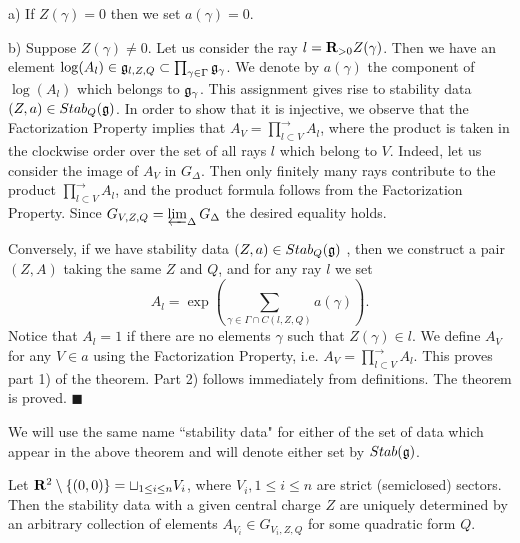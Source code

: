 \documentclass[12pt]{article}
\begin{document}
a) If $Z(\gamma)=0$ then we set $a({\gamma})=0$.

b) Suppose $Z(\gamma)\ne 0$. Let us consider the ray $l={\bf R}_{>0}Z(\gamma)$.
Then we have an element $\log(A_l)\in {\mathfrak g}_{l,Z,Q}\subset \prod_{\gamma\in \Gamma}{\mathfrak g}_{\gamma}$.
We denote by $a({\gamma})$ the component of $\log(A_l)$ which belongs to ${\mathfrak g}_{\gamma}$.
This assignment gives rise to stability data $(Z,a)\in {Stab}_Q({\mathfrak g})$. In order to show that it is injective, we observe
that the Factorization Property implies that $A_V=\prod_{l\subset V}^{\longrightarrow}A_l$, where
the product is taken in the clockwise order over the set of all rays $l$ which belong to $V$.
Indeed, let us consider the image of $A_V$ in $G_{\Delta}$. Then only finitely many rays contribute
to the product $\prod_{l\subset V}^{\longrightarrow}A_l$, and the product formula follows from the Factorization Property.
Since $G_{V,Z,Q}=\varprojlim_{\Delta}G_{\Delta}$ the desired equality holds.

Conversely, if we have stability data $(Z,a)\in{Stab}_Q({\mathfrak g})$  , then we construct a pair $(Z,A)$ taking the same $Z$
and $Q$, and for any ray $l$ we set
$$A_l=\exp\left(\sum_{\gamma\in \Gamma\cap C(l,Z,Q)}a({\gamma})\right).$$
Notice that $A_l=1$  if there are no elements $\gamma$ such that $Z(\gamma)\in l$. We define $A_V$ for any $V\in a$ using
the Factorization Property, i.e. $A_V=\prod_{l\subset V}^{\longrightarrow}A_l.$ This proves part 1) of the theorem. Part 2) follows immediately from definitions.
The theorem is proved. $\blacksquare$

\begin{rmk} We will use the same name ``stability data" for either of the set of data
which appear in the above theorem and will denote either set by $Stab({\mathfrak g})$.

\end{rmk}



\begin{rmk} Let ${\bf R}^2\setminus \{(0,0)\}=\sqcup_{1\le i\le n}V_i$, where $V_i, 1\le i\le n$ are strict (semiclosed) sectors. Then  the stability data with
a given central charge $Z$ are uniquely determined by an arbitrary collection of elements
$A_{V_i}\in G_{V_i,Z,Q}$ for some quadratic form $Q$. 
\end{rmk}
\end{document}
